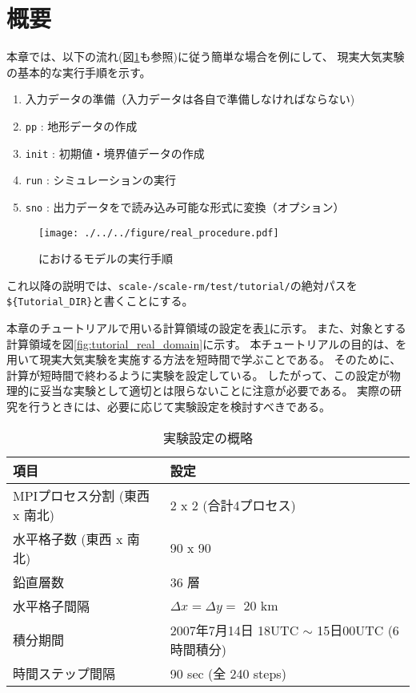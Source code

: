 \section{概要} \label{sec:tutorial_real_intro}
本章では、以下の流れ(図\ref{fig:howto}も参照)に従う簡単な場合を例にして、
現実大気実験の基本的な実行手順を示す。
\begin{enumerate}
\item  入力データの準備（入力データは各自で準備しなければならない)
\item  \texttt{pp}      : 地形データの作成
\item  \texttt{init}    : 初期値・境界値データの作成
\item  \texttt{run}     : シミュレーションの実行
\item  \texttt{sno}     : 出力データを\grads で読み込み可能な\netcdf 形式に変換（オプション）
\end{enumerate}

\begin{figure}[b]
\begin{center}
  \texttt{[image: ./../../figure/real\_procedure.pdf]}\\
  \caption{\scalerm におけるモデルの実行手順}
  \label{fig:howto}
\end{center}
\end{figure}

これ以降の説明では、\texttt{scale-{\version}/scale-rm/test/tutorial/}の絶対パスを
\verb|${Tutorial_DIR}|と書くことにする。

本章のチュートリアルで用いる計算領域の設定を表\ref{tab:grids}に示す。
また、対象とする計算領域を図\ref{fig:tutorial_real_domain}に示す。
本チュートリアルの目的は、\scalerm を用いて現実大気実験を実施する方法を短時間で学ぶことである。
そのために、計算が短時間で終わるように実験を設定している。
したがって、この設定が物理的に妥当な実験として適切とは限らないことに注意が必要である。
実際の研究を行うときには、必要に応じて実験設定を検討すべきである。

\begin{table}[h]
\begin{center}
  \caption{実験設定の概略}
  \label{tab:grids}
  \begin{tabularx}{150mm}{|l|X|} \hline
    \rowcolor[gray]{0.9} 項目 & 設定 \\ \hline
    MPIプロセス分割 (東西 x 南北) & 2 x 2 (合計4プロセス) \\ \hline
    水平格子数 (東西 x 南北) & 90 x 90 \\ \hline
    鉛直層数                 & 36 層                  \\ \hline
    水平格子間隔             & $\Delta x = \Delta y =$ 20 km       \\ \hline
    積分期間 & 2007年7月14日 18UTC $\sim$ 15日00UTC (6時間積分) \\ \hline
    時間ステップ間隔 & 90 sec (全 240 steps) \\ \hline
  \end{tabularx}
\end{center}
\end{table}

